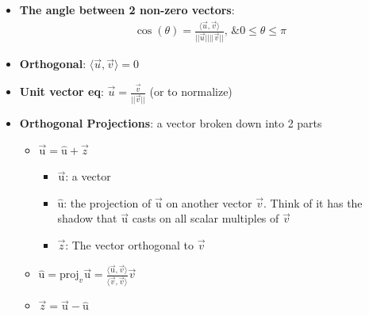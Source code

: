\documentclass[15pt]{article}
\begin{document}
\begin{flushleft}
\begin{itemize}
    \item \textbf{The angle between 2 non-zero vectors}:
            \begin{align*}
                \cos(\theta) = \frac{\langle \vec{u},\vec{v} \rangle}
                {||\vec{u}||||\vec{v}||} \text{, \& } 0 \leq \theta \leq \pi
            \end{align*}
    \item \textbf{Orthogonal}: $\langle \vec{u}, \vec{v} \rangle = 0$
    \item \textbf{Unit vector eq}: $\vec{u} = \frac{\vec{v}}{||\vec{v}||}$ (or 
            to normalize)
    \item \textbf{Orthogonal Projections}: a vector broken down into 2 parts
            \begin{itemize}
                \item $\vec{\text{u}} = \hat{\text{u}} + \vec{z}$
                        \begin{itemize}
                            \item $\vec{\text{u}}$: a vector
                            \item $\hat{\text{u}}$: the projection of 
                                    $\vec{\text{u}}$ on another vector 
                                    $\vec{v}$. Think of it has the shadow that 
                                    $\vec{\text{u}}$ casts on all scalar 
                                    multiples of $\vec{v}$
                            \item $\vec{z}$: The vector orthogonal to $\vec{v}$
                        \end{itemize}
                \item $\hat{\text{u}} = \text{proj}_v \vec{\text{u}} = 
                        \frac{\langle \vec{\text{u}},\vec{v} \rangle}{\langle 
                        \vec{v}, \vec{v} \rangle}\vec{v}$
                \item $\vec{z} = \vec{\text{u}} - \hat{\text{u}}$
            \end{itemize}
\end{itemize}


\end{flushleft}
\end{document}
